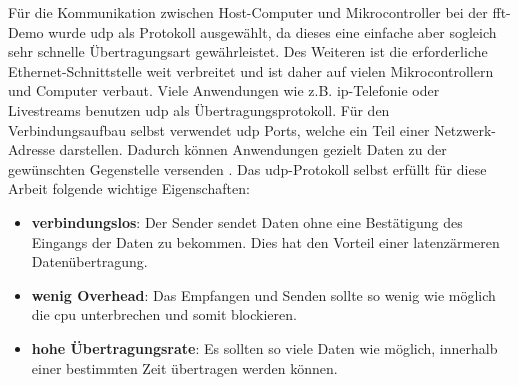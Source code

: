 \documentclass[../EDF Master Thesis.tex]{subfiles}
\begin{document}
    Für die Kommunikation zwischen Host-Computer und Mikrocontroller bei der \ac{fft}-Demo wurde \ac{udp} als Protokoll ausgewählt, da dieses eine einfache aber sogleich sehr schnelle Übertragungsart gewährleistet.
    Des Weiteren ist die erforderliche Ethernet-Schnittstelle weit verbreitet und ist daher auf vielen Mikrocontrollern und Computer verbaut.
    Viele Anwendungen wie z.B. \ac{ip}-Telefonie oder Livestreams benutzen \ac{udp} als Übertragungsprotokoll.
    Für den Verbindungsaufbau selbst verwendet \ac{udp} Ports, welche ein Teil einer Netzwerk-Adresse darstellen.
    Dadurch können Anwendungen gezielt Daten zu der gewünschten Gegenstelle versenden \parencite{elektronik_kompendium}.
    Das \ac{udp}-Protokoll selbst erfüllt für diese Arbeit folgende wichtige Eigenschaften:
    \begin{itemize}
        \item \textbf{verbindungslos}: Der Sender sendet Daten ohne eine Bestätigung des Eingangs der Daten zu bekommen.
                                       Dies hat den Vorteil einer latenzärmeren Datenübertragung.
        \item \textbf{wenig Overhead}: Das Empfangen und Senden sollte so wenig wie möglich die \ac{cpu} unterbrechen und somit blockieren.
        \item \textbf{hohe Übertragungsrate}: Es sollten so viele Daten wie möglich, innerhalb einer bestimmten Zeit übertragen werden können.
    \end{itemize}
\end{document}
